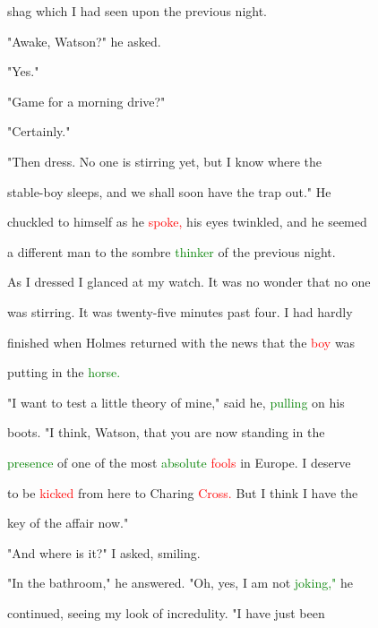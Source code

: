  shag which I had seen upon the previous night.



 "Awake, Watson?" he asked.



 "Yes."



 "Game for a morning drive?"



 "Certainly."



 "Then dress. No one is stirring yet, but I know where the

 stable-boy sleeps, and we shall soon have the trap out." He

 \textcolor{BurntOrange}{chuckled} to himself as he \textcolor{red}{spoke,} his eyes \textcolor{BurntOrange}{twinkled,} and he seemed

 a different man to the sombre \textcolor{green}{thinker} of the previous night.



 As I dressed I glanced at my \textcolor{BurntOrange}{watch.} It was no wonder that no one

 was stirring. It was twenty-five minutes past four. I had hardly

 finished when Holmes returned with the news that the \textcolor{red}{boy} was

 putting in the \textcolor{green}{horse.}



 "I want to test a little \textcolor{BurntOrange}{theory} of mine," said he, \textcolor{green}{pulling} on his

 boots. "I think, Watson, that you are now standing in the

 \textcolor{green}{presence} of one of the most \textcolor{green}{absolute} \textcolor{red}{fools} in Europe. I \textcolor{BurntOrange}{deserve}

 to be \textcolor{red}{kicked} from here to Charing \textcolor{red}{Cross.} But I think I have the

 key of the affair now."



 "And where is it?" I asked, \textcolor{BurntOrange}{smiling.}



 "In the bathroom," he answered. "Oh, yes, I am not \textcolor{green}{joking,"} he

 continued, seeing my look of incredulity. "I have just been

